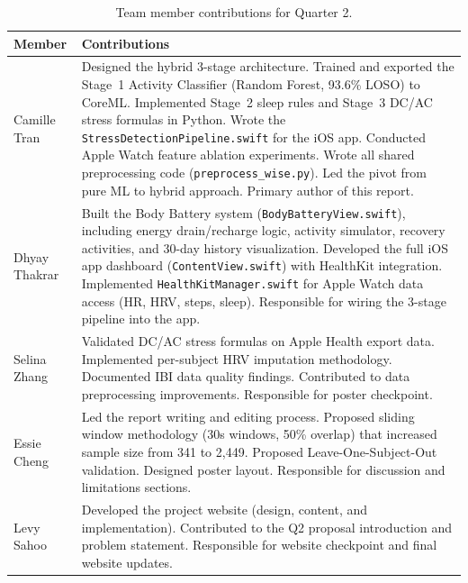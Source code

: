 \documentclass[12pt,letterpaper]{article}
\begin{document}
\begin{table}[H]
\centering
\caption{Team member contributions for Quarter 2.}
\label{tab:contributions}
\begin{tabular}{p{3cm}p{11cm}}
\toprule
\textbf{Member} & \textbf{Contributions} \\
\midrule
Camille Tran & Designed the hybrid 3-stage architecture. Trained and exported the Stage~1 Activity Classifier (Random Forest, 93.6\% LOSO) to CoreML. Implemented Stage~2 sleep rules and Stage~3 DC/AC stress formulas in Python. Wrote the \texttt{StressDetectionPipeline.swift} for the iOS app. Conducted Apple Watch feature ablation experiments. Wrote all shared preprocessing code (\texttt{preprocess\_wise.py}). Led the pivot from pure ML to hybrid approach. Primary author of this report. \\[6pt]
Dhyay Thakrar & Built the Body Battery system (\texttt{BodyBatteryView.swift}), including energy drain/recharge logic, activity simulator, recovery activities, and 30-day history visualization. Developed the full iOS app dashboard (\texttt{ContentView.swift}) with HealthKit integration. Implemented \texttt{HealthKitManager.swift} for Apple Watch data access (HR, HRV, steps, sleep). Responsible for wiring the 3-stage pipeline into the app. \\[6pt]
Selina Zhang & Validated DC/AC stress formulas on Apple Health export data. Implemented per-subject HRV imputation methodology. Documented IBI data quality findings. Contributed to data preprocessing improvements. Responsible for poster checkpoint. \\[6pt]
Essie Cheng & Led the report writing and editing process. Proposed sliding window methodology (30s windows, 50\% overlap) that increased sample size from 341 to 2,449. Proposed Leave-One-Subject-Out validation. Designed poster layout. Responsible for discussion and limitations sections. \\[6pt]
Levy Sahoo & Developed the project website (design, content, and implementation). Contributed to the Q2 proposal introduction and problem statement. Responsible for website checkpoint and final website updates. \\
\bottomrule
\end{tabular}
\end{table}
\end{document}
